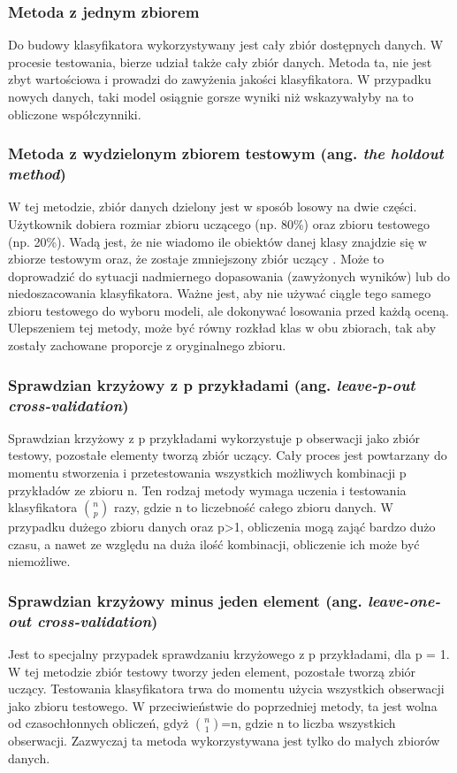 \subsubsection{Metoda z jednym zbiorem}
Do budowy klasyfikatora wykorzystywany jest cały zbiór dostępnych danych. W procesie testowania, bierze udział także cały zbiór danych. Metoda ta, nie jest zbyt wartościowa i prowadzi do zawyżenia jakości klasyfikatora. W przypadku nowych danych, taki model osiągnie gorsze wyniki niż wskazywałyby na to obliczone współczynniki.

\subsubsection{Metoda z wydzielonym zbiorem testowym (ang. \textit{the holdout method})}
W tej metodzie, zbiór danych dzielony jest w sposób losowy na dwie części. Użytkownik dobiera rozmiar zbioru uczącego (np. 80\%) oraz zbioru testowego (np. 20\%). Wadą jest, że nie wiadomo ile obiektów danej klasy znajdzie się w zbiorze testowym oraz, że zostaje zmniejszony zbiór uczący . Może to doprowadzić do sytuacji nadmiernego dopasowania (zawyżonych wyników) lub do niedoszacowania klasyfikatora. Ważne jest, aby nie używać ciągle tego samego zbioru testowego do wyboru modeli, ale dokonywać losowania przed każdą oceną.\\
Ulepszeniem tej metody, może być równy rozkład klas w obu zbiorach, tak aby zostały zachowane proporcje z oryginalnego zbioru.

\subsubsection{Sprawdzian krzyżowy z p przykładami (ang. \textit{leave-p-out cross-validation})}
Sprawdzian krzyżowy z p przykładami wykorzystuje p obserwacji jako zbiór testowy, pozostałe elementy tworzą zbiór uczący. Cały proces jest powtarzany do momentu stworzenia i przetestowania wszystkich możliwych kombinacji p przykładów ze zbioru n. Ten rodzaj metody wymaga uczenia i testowania klasyfikatora $\binom{n}{p}$ razy, gdzie n to liczebność całego zbioru danych. W przypadku dużego zbioru danych oraz p>1, obliczenia mogą zająć bardzo dużo czasu, a nawet ze względu na duża ilość kombinacji, obliczenie ich może być niemożliwe.

\subsubsection{Sprawdzian krzyżowy minus jeden element (ang. \textit{leave-one-out cross-validation})}
Jest to specjalny przypadek sprawdzaniu krzyżowego z p przykładami, dla p = 1. W tej metodzie zbiór testowy tworzy jeden element, pozostałe tworzą zbiór uczący. Testowania klasyfikatora trwa do momentu użycia wszystkich obserwacji jako zbioru testowego. W przeciwieństwie do poprzedniej metody, ta jest wolna od czasochłonnych obliczeń, gdyż $\binom{n}{1}$=n, gdzie n to liczba wszystkich obserwacji. Zazwyczaj ta metoda wykorzystywana jest tylko do małych zbiorów danych.

